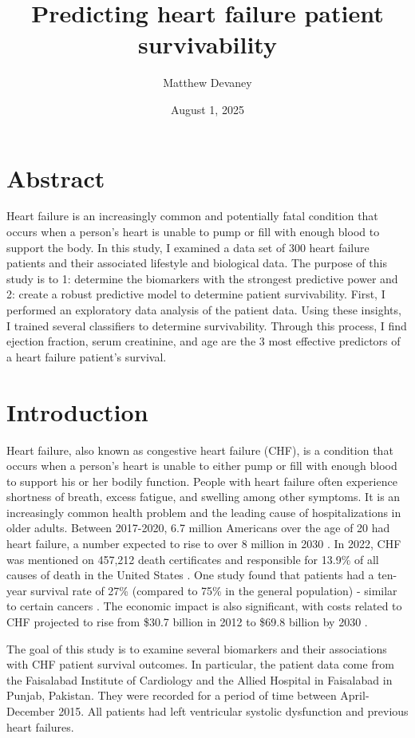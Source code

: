 \documentclass[12pt, letterpaper]{article}
\title{Predicting heart failure patient survivability}
\author{Matthew Devaney}
\date{August 1, 2025}
\begin{document}
	\maketitle
	\onehalfspacing
	\section*{Abstract}
	
	Heart failure is an increasingly common and potentially fatal condition that occurs when a person's heart is unable to pump or fill with enough blood to support the body. In this study, I examined a data set of 300 heart failure patients and their associated lifestyle and biological data. The purpose of this study is to 1: determine the biomarkers with the strongest predictive power and 2: create a robust predictive model to determine patient survivability. First, I performed an exploratory data analysis of the patient data. Using these insights, I trained several classifiers to determine survivability. Through this process, I find ejection fraction, serum creatinine, and age are the 3 most effective predictors of a heart failure patient's survival. 
	
	\section{Introduction}
	
	Heart failure, also known as congestive heart failure (CHF), is a condition that occurs when a person's heart is unable to either pump or fill with enough blood to support his or her bodily function. People with heart failure often experience shortness of breath, excess fatigue, and swelling among other symptoms. It is an increasingly common health problem and the leading cause of hospitalizations in older adults. Between 2017-2020, 6.7 million Americans over the age of 20 had heart failure, a number expected to rise to over 8 million in 2030 \cite{hf_info}. In 2022, CHF was mentioned on 457,212 death certificates and responsible for 13.9\% of all causes of death in the United States \cite{cdcAboutHeart}. One study found that patients had a ten-year survival rate of 27\% (compared to 75\% in the general population) - similar to certain cancers \cite{nihChronicHeart}. The economic impact is also significant, with costs related to CHF projected to rise from \$30.7 billion in 2012 to \$69.8 billion by 2030 \cite{hf_info}.
	
	The goal of this study is to examine several biomarkers and their associations with CHF patient survival outcomes. In particular, the patient data come from the Faisalabad Institute of Cardiology and the Allied Hospital in Faisalabad in Punjab, Pakistan. They were recorded for a period of time between April-December 2015. All patients had left ventricular systolic dysfunction and previous heart failures.
	
\end{document}
